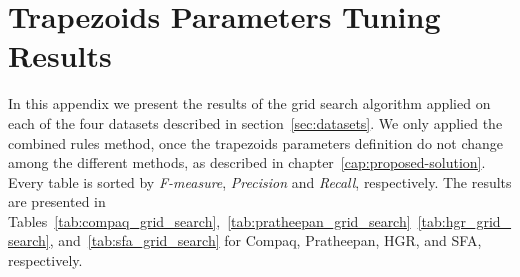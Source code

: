\chapter{Trapezoids Parameters Tuning Results}
\label{ape:trapezoids_parameters_tuning}

In this appendix we present the results of the grid search algorithm applied on each of the four datasets described in section~\ref{sec:datasets}. We only applied the combined rules method, once the trapezoids parameters definition do not change among the different methods, as described in chapter~\ref{cap:proposed-solution}. Every table is sorted by \emph{F-measure}, \emph{Precision} and \emph{Recall}, respectively. The results are presented in Tables~\ref{tab:compaq_grid_search},~\ref{tab:pratheepan_grid_search}~\ref{tab:hgr_grid_search}, and~\ref{tab:sfa_grid_search} for Compaq, Pratheepan, HGR, and SFA, respectively.


\singlespacing

